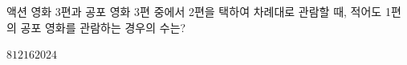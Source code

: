 액션 영화 3편과 공포 영화 3편 중에서 2편을 택하여 차례대로 관람할 때, 적어도 1편의 공포 영화를 관람하는 경우의 수는?
\begin{choices32}{$8$}{$12$}{$16$}{$20$}{$24$}\end{choices32}
